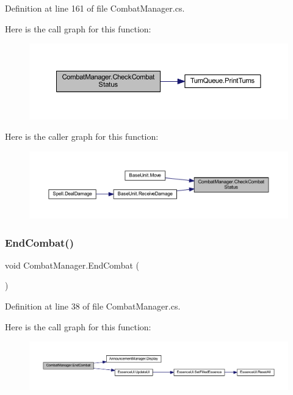 Definition at line 161 of file Combat\+Manager.\+cs.

Here is the call graph for this function\+:
\nopagebreak
\begin{figure}[H]
\begin{center}
\leavevmode
\includegraphics[width=350pt]{class_combat_manager_aea6dfda807c4ec793ed26c5d220b84fb_cgraph}
\end{center}
\end{figure}
Here is the caller graph for this function\+:
\nopagebreak
\begin{figure}[H]
\begin{center}
\leavevmode
\includegraphics[width=350pt]{class_combat_manager_aea6dfda807c4ec793ed26c5d220b84fb_icgraph}
\end{center}
\end{figure}
\mbox{\label{class_combat_manager_a8d14cf9a8265e20264151a615e309f12}} 
\subsubsection{\texorpdfstring{EndCombat()}{EndCombat()}}
{\footnotesize\ttfamily void Combat\+Manager.\+End\+Combat (\begin{DoxyParamCaption}{ }\end{DoxyParamCaption})}



Definition at line 38 of file Combat\+Manager.\+cs.

Here is the call graph for this function\+:
\nopagebreak
\begin{figure}[H]
\begin{center}
\leavevmode
\includegraphics[width=350pt]{class_combat_manager_a8d14cf9a8265e20264151a615e309f12_cgraph}
\end{center}
\end{figure}
\mbox{\label{class_combat_manager_ae306deb3898e096bf5ad6cdd705b82fa}} 
